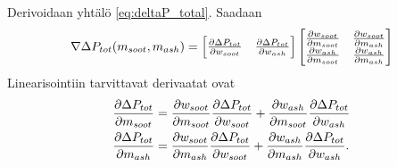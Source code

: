 





Derivoidaan yhtälö \eqref{eq:deltaP_total}. Saadaan
\begin{align}
    \nabla \Delta P_{tot}(m_{soot}, m_{ash})=
    \begin{bmatrix}   \frac{\partial \Delta P_{tot}}{\partial w_{soot}}
        &   \frac{\partial \Delta P_{tot}}{\partial w_{ash}}
         \end{bmatrix}
    \begin{bmatrix} 
        \frac{\partial w_{soot}}{\partial m_{soot}} & \frac{\partial w_{soot}}{\partial m_{ash}}
    \\  \frac{\partial w_{ash}}{\partial m_{soot}} & \frac{\partial w_{ash}}{\partial m_{ash}}
         \end{bmatrix}
\end{align}
Linearisointiin tarvittavat derivaatat ovat 
\begin{align}
    \frac{\partial \Delta P_{tot}}{\partial m_{soot}} &=
        \frac{\partial w_{soot}}{\partial m_{soot}}
        \frac{\partial \Delta P_{tot}}{\partial w_{soot}}
        +
        \frac{\partial w_{ash}}{\partial m_{soot}}
        \frac{\partial \Delta P_{tot}}{\partial w_{ash}}
    \\
    \frac{\partial \Delta P_{tot}}{\partial m_{ash}} &=
        \frac{\partial w_{soot}}{\partial m_{ash}}
        \frac{\partial \Delta P_{tot}}{\partial w_{soot}}
        +
        \frac{\partial w_{ash}}{\partial m_{ash}}
        \frac{\partial \Delta P_{tot}}{\partial w_{ash}}.
\end{align}